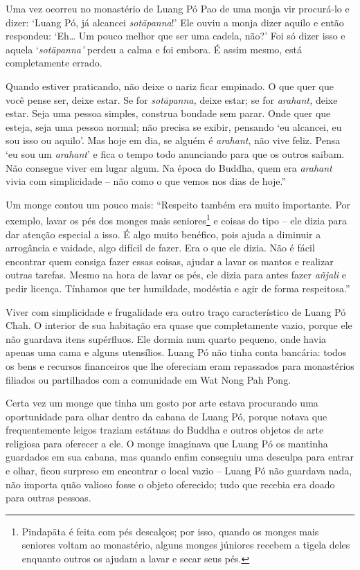 Uma vez ocorreu no monastério de Luang Pó Pao de uma monja vir
procurá-lo e dizer: `Luang Pó, já alcancei \emph{sotāpanna}!' Ele ouviu
a monja dizer aquilo e então respondeu: `Eh\ldots{} Um pouco melhor que
ser uma cadela, não?' Foi só dizer isso e aquela `\emph{sotāpanna'}
perdeu a calma e foi embora. É assim mesmo, está completamente errado.

Quando estiver praticando, não deixe o nariz ficar empinado. O que quer
que você pense ser, deixe estar. Se for \emph{sotāpanna,} deixe estar;
se for \emph{arahant,} deixe estar. Seja uma pessoa simples, construa
bondade sem parar. Onde quer que esteja, seja uma pessoa normal; não
precisa se exibir, pensando `eu alcancei, eu sou isso ou aquilo'. Mas
hoje em dia, se alguém é \emph{arahant}, não vive feliz. Pensa `eu sou
um \emph{arahant}' e fica o tempo todo anunciando para que os outros
saibam. Não consegue viver em lugar algum. Na época do Buddha, quem era
\emph{arahant} vivia com simplicidade -- não como o que vemos nos dias
de hoje.''

Um monge contou um pouco mais: ``Respeito também era muito importante.
Por exemplo, lavar os pés dos monges mais seniores\footnote{Pindapāta é
  feita com pés descalços; por isso, quando os monges mais seniores
  voltam ao monastério, alguns monges júniores recebem a tigela deles
  enquanto outros os ajudam a lavar e secar seus pés.} e coisas do tipo
-- ele dizia para dar atenção especial a isso. É algo muito benéfico,
pois ajuda a diminuir a arrogância e vaidade, algo difícil de fazer. Era
o que ele dizia. Não é fácil encontrar quem consiga fazer essas coisas,
ajudar a lavar os mantos e realizar outras tarefas. Mesmo na hora de
lavar os pés, ele dizia para antes fazer \emph{añjali} e pedir licença.
Tínhamos que ter humildade, modéstia e agir de forma respeitosa.''

Viver com simplicidade e frugalidade era outro traço característico de
Luang Pó Chah. O interior de sua habitação era quase que completamente
vazio, porque ele não guardava itens supérfluos. Ele dormia num quarto
pequeno, onde havia apenas uma cama e alguns utensílios. Luang Pó não
tinha conta bancária: todos os bens e recursos financeiros que lhe
ofereciam eram repassados para monastérios filiados ou partilhados com a
comunidade em Wat Nong Pah Pong.

Certa vez um monge que tinha um gosto por arte estava procurando uma
oportunidade para olhar dentro da cabana de Luang Pó, porque notava que
frequentemente leigos traziam estátuas do Buddha e outros objetos de
arte religiosa para oferecer a ele. O monge imaginava que Luang Pó os
mantinha guardados em sua cabana, mas quando enfim conseguiu uma
desculpa para entrar e olhar, ficou surpreso em encontrar o local vazio
-- Luang Pó não guardava nada, não importa quão valioso fosse o objeto
oferecido; tudo que recebia era doado para outras pessoas.

